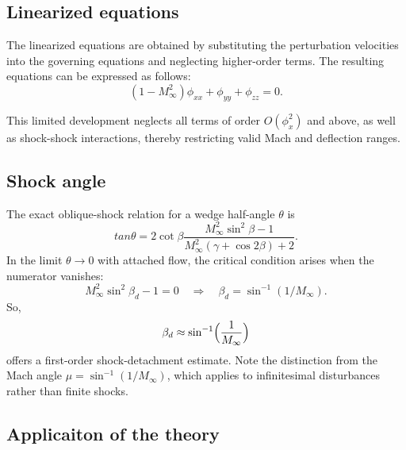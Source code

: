 \subsection{Linearized equations}
\label{subsec:linearized_equations}
The linearized equations are obtained by substituting the perturbation velocities into the governing equations and neglecting higher-order terms. The resulting equations can be expressed as follows:
\begin{equation}
	(1 - M_\infty^2) \phi_{xx} + \phi_{yy} + \phi_{zz} = 0.
	\label{eq:small-disturb}
\end{equation}
	
This limited development neglects all terms of order \(O(\phi_x^2)\) and above, as well as shock-shock interactions, thereby restricting valid Mach and deflection ranges.

\subsection{Shock angle}
The exact oblique-shock relation for a wedge half-angle \(\theta\) is
\begin{equation}
	tan\theta = 2\cot\beta\frac{M_\infty^2\sin^2\beta - 1}{M_\infty^2(\gamma+\cos2\beta)+2}.
\end{equation}
In the limit \(\theta\to0\) with attached flow, the critical condition arises when the numerator vanishes:
\begin{equation*}
	M_\infty^2\sin^2\beta_d - 1 = 0
	\quad\Longrightarrow\quad
	\beta_d = \sin^{-1}(1/M_\infty).
\end{equation*}
So,
\begin{equation}
\beta_d \approx \sin^{-1}\Bigl(\frac{1}{M_\infty}\Bigr)
\label{eq:beta_d}
\end{equation}
offers a first-order shock-detachment estimate.  Note the distinction from the Mach angle \(\mu=\sin^{-1}(1/M_\infty)\), which applies to infinitesimal disturbances rather than finite shocks.







\subsection{Applicaiton of the theory}


